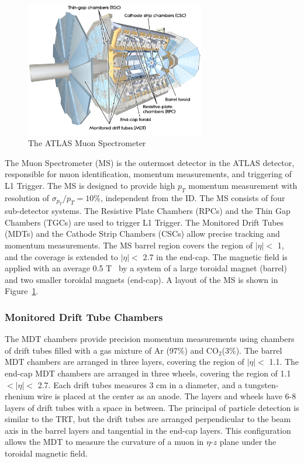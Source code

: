 \begin{figure}[!htb]
    \includegraphics[width=0.7\textwidth]{figs/ms.png}
    \centering
    \caption{The ATLAS Muon Spectrometer}
    \label{fig:ms}
\end{figure}
The Muon Spectrometer (MS) is the outermost detector in the ATLAS detector, responsible for muon identification, momentum measurements, and triggering of L1 Trigger. The MS is designed to provide high $p_{T}$ momentum measurement with resolution of $\sigma_{p_{T}} / p_{T} = 10\%$, independent from the ID. The MS consists of four sub-detector systems. The Resistive Plate Chambers (RPCs) and the Thin Gap Chambers (TGCs) are used to trigger L1 Trigger. The Monitored Drift Tubes (MDTs) and the Cathode Strip Chambers (CSCs) allow precise tracking and momentum measurements. The MS barrel region covers the region of $|\eta|<$ 1, and the coverage is extended to $|\eta|<$ 2.7 in the end-cap. The magnetic field is applied with an average 0.5 T~\cite{ARNAUD2008265} by a system of a large toroidal magnet (barrel) and two smaller toroidal magnets (end-cap). A layout of the MS is shown in Figure~\ref{fig:ms}.

\subsubsection{Monitored Drift Tube Chambers}
\label{sec:atlas:mdt}

The MDT chambers provide precision momentum measurements using chambers of drift tubes filled with a gas mixture of Ar (97\%) and $\mathrm{CO}_{2}$(3\%). The barrel MDT chambers are arranged in three layers, covering the region of $|\eta|<$ 1.1. The end-cap MDT chambers are arranged in three wheels, covering the region of 1.1 $<|\eta|<$ 2.7. Each drift tubes measures 3 \si{\centi\meter} in a diameter, and a tungsten-rhenium wire is placed at the center as an anode. The layers and wheels have 6-8 layers of drift tubes with a space in between. The principal of particle detection is similar to the TRT, but the drift tubes are arranged perpendicular to the beam axis in the barrel layers and tangential in the end-cap layers. This configuration allows the MDT to measure the curvature of a muon in $\eta$-$z$ plane under the toroidal magnetic field.

